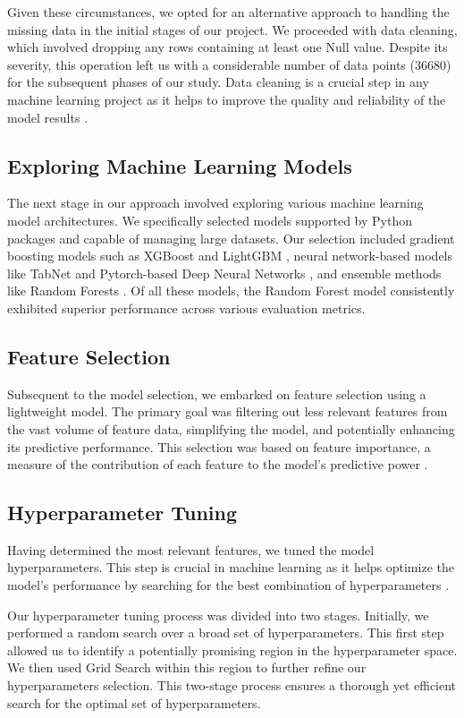 \documentclass{article}
\begin{document}
Given these circumstances, we opted for an alternative approach to handling the missing data in the initial stages of our project. We proceeded with data cleaning, which involved dropping any rows containing at least one Null value. Despite its severity, this operation left us with a considerable number of data points (36680) for the subsequent phases of our study. Data cleaning is a crucial step in any machine learning project as it helps to improve the quality and reliability of the model results \cite{Pyle1999}.

\subsection{Exploring Machine Learning Models}
The next stage in our approach involved exploring various machine learning model architectures. We specifically selected models supported by Python packages and capable of managing large datasets. Our selection included gradient boosting models such as XGBoost \cite{Chen2016} and LightGBM \cite{Ke2017}, neural network-based models like TabNet \cite{Arik2020} and Pytorch-based Deep Neural Networks \cite{Paszke2017}, and ensemble methods like Random Forests \cite{Breiman2001}. Of all these models, the Random Forest model consistently exhibited superior performance across various evaluation metrics.

\subsection{Feature Selection}
Subsequent to the model selection, we embarked on feature selection using a lightweight model. The primary goal was filtering out less relevant features from the vast volume of feature data, simplifying the model, and potentially enhancing its predictive performance. This selection was based on feature importance, a measure of the contribution of each feature to the model's predictive power \cite{Guyon2003}.

\subsection{Hyperparameter Tuning}
Having determined the most relevant features, we tuned the model hyperparameters. This step is crucial in machine learning as it helps optimize the model's performance by searching for the best combination of hyperparameters \cite{Bergstra2012}.

Our hyperparameter tuning process was divided into two stages. Initially, we performed a random search over a broad set of hyperparameters. This first step allowed us to identify a potentially promising region in the hyperparameter space. We then used Grid Search within this region to further refine our hyperparameters selection. This two-stage process ensures a thorough yet efficient search for the optimal set of hyperparameters.
\end{document}
